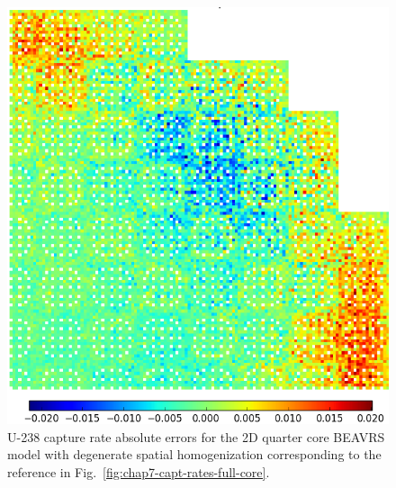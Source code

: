 \begin{appendices}
\begin{figure}[h!]
\centering
\includegraphics[width=\linewidth]{figures/patterns/appendix/full-core/capt-err-degenerate-magnitude}
\vspace{2mm}
\caption[U-238 capture rate absolute errors for BEAVRS]{U-238 capture rate absolute errors for the 2D quarter core \ac{BEAVRS} model with degenerate spatial homogenization corresponding to the reference in Fig.~\ref{fig:chap7-capt-rates-full-core}.}
\label{fig:degenerate-full-core-capt-err-abs}
\end{figure}

\clearpage


\end{appendices}
